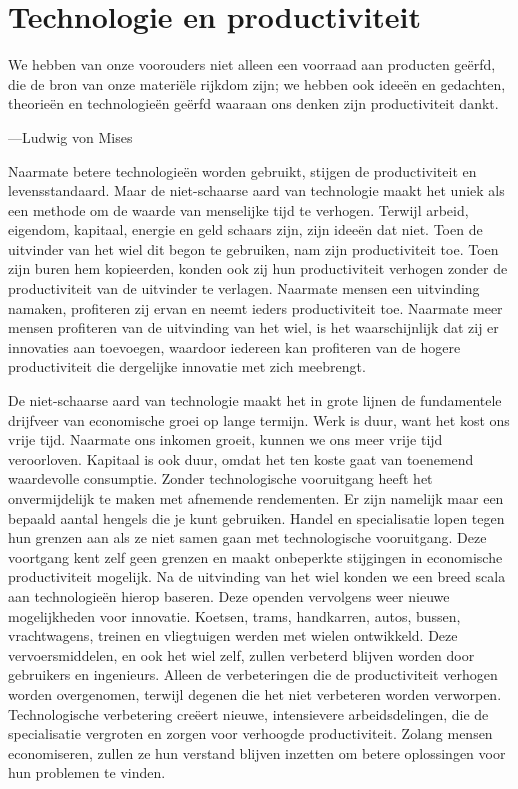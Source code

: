 \hypertarget{technologie-en-productiviteit}{%
\section{Technologie en productiviteit}\label{technologie-en-productiviteit}}

\begin{blockquotebox}
    We hebben van onze voorouders niet alleen een voorraad aan producten geërfd, die de bron van onze materiële rijkdom zijn; we hebben ook ideeën en gedachten, theorieën en technologieën geërfd waaraan ons denken zijn productiviteit dankt.\footnotemark
    \par\raggedleft---Ludwig von Mises
\end{blockquotebox}
\autocite{75}

Naarmate betere technologieën worden gebruikt, stijgen de productiviteit en levensstandaard. Maar de niet-schaarse aard van technologie maakt het uniek als een methode om de waarde van menselijke tijd te verhogen. Terwijl arbeid, eigendom, kapitaal, energie en geld schaars zijn, zijn ideeën dat niet. Toen de uitvinder van het wiel dit begon te gebruiken, nam zijn productiviteit toe. Toen zijn buren hem kopieerden, konden ook zij hun productiviteit verhogen zonder de productiviteit van de uitvinder te verlagen. Naarmate mensen een uitvinding namaken, profiteren zij ervan en neemt ieders productiviteit toe. Naarmate meer mensen profiteren van de uitvinding van het wiel, is het waarschijnlijk dat zij er innovaties aan toevoegen, waardoor iedereen kan profiteren van de hogere productiviteit die dergelijke innovatie met zich meebrengt.

De niet-schaarse aard van technologie maakt het in grote lijnen de fundamentele drijfveer van economische groei op lange termijn. Werk is duur, want het kost ons vrije tijd. Naarmate ons inkomen groeit, kunnen we ons meer vrije tijd veroorloven. Kapitaal is ook duur, omdat het ten koste gaat van toenemend waardevolle consumptie. Zonder technologische vooruitgang heeft het onvermijdelijk te maken met afnemende rendementen. Er zijn namelijk maar een bepaald aantal hengels die je kunt gebruiken. Handel en specialisatie lopen tegen hun grenzen aan als ze niet samen gaan met technologische vooruitgang. Deze voortgang kent zelf geen grenzen en maakt onbeperkte stijgingen in economische productiviteit mogelijk. Na de uitvinding van het wiel konden we een breed scala aan technologieën hierop baseren. Deze openden vervolgens weer nieuwe mogelijkheden voor innovatie. Koetsen, trams, handkarren, auto\textquotesingle s, bussen, vrachtwagens, treinen en vliegtuigen werden met wielen ontwikkeld. Deze vervoersmiddelen, en ook het wiel zelf, zullen verbeterd blijven worden door gebruikers en ingenieurs. Alleen de verbeteringen die de productiviteit verhogen worden overgenomen, terwijl degenen die het niet verbeteren worden verworpen. Technologische verbetering creëert nieuwe, intensievere arbeidsdelingen, die de specialisatie vergroten en zorgen voor verhoogde productiviteit. \autocite{76} Zolang mensen economiseren, zullen ze hun verstand blijven inzetten om betere oplossingen voor hun problemen te vinden.

